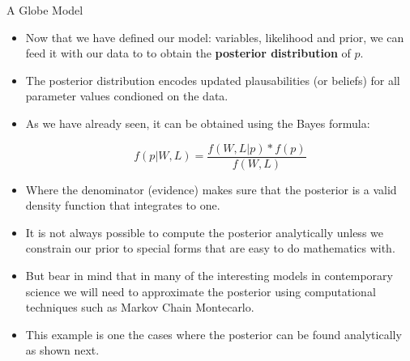 \documentclass[handout]{beamer}
\begin{document}
\begin{frame}{A Globe Model}
\scriptsize{

\begin{itemize}
\item Now that we have defined our model: variables, likelihood and prior, we can feed it with our data to  to obtain the \textbf{posterior distribution} of $p$.
\item The posterior distribution encodes updated plausabilities (or beliefs) for all parameter values condioned on the data.
\item As we have already seen, it can be obtained using the Bayes formula:

\begin{displaymath}
 f(p|W,L) = \frac{f(W,L|p)* f(p)}{f(W,L)}
\end{displaymath}

\item Where the denominator (evidence) makes sure that the posterior is a valid density function that integrates to one.

\item It is not always possible to compute the posterior analytically unless we constrain our prior to special forms that are easy to do mathematics with.

\item But bear in mind that in many of the interesting models in contemporary science we will need to approximate the posterior using computational techniques such as Markov Chain Montecarlo. 

\item This example is one the cases where the posterior can be found analytically as shown next.

\end{itemize}

} 


\end{frame}
\end{document}
